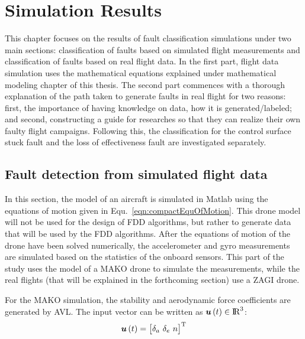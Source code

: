 \chapter{Simulation Results}

This chapter focuses on the results of fault classification simulations under two main sections: classification of faults based on simulated flight measurements and classification of faults based on real flight data. 
In the first part, flight data simulation uses the mathematical equations explained under mathematical modeling chapter of this thesis. 
The second part commences with a thorough explanation of the path taken to generate faults in real flight for two reasons: first, the importance of having knowledge on data, how it is generated/labeled; and second, constructing a guide for researches so that they can realize their own faulty flight campaigns. 
Following this, the classification for the control surface stuck fault and the loss of effectiveness fault are investigated separately. 

\section{Fault detection from simulated flight data}

In this section, the model of an aircraft is simulated in Matlab using the equations of motion given in Equ.~\ref{eqn:compactEquOfMotion}. 
This drone model will not be used for the design of FDD algorithms, but rather to generate data that will be used by the FDD algorithms. 
After the equations of motion of the drone have been solved numerically, the accelerometer and gyro measurements are simulated based on the statistics of the onboard sensors. 
This part of the study uses the model of a MAKO drone to simulate the measurements, while the real flights (that will be explained in the forthcoming section) use a ZAGI drone.

For the MAKO simulation, the stability and aerodynamic force coefficients are generated by AVL. The input vector can be written as $\bm{u}\left(t\right) \in {\rm I\!R} ^3 $:
\begin{equation}
\bm{u}\left(t\right)= \begin{bmatrix} {\delta}_{a}\ {\delta}_{e}\ n \end{bmatrix}^{\rm T}
\end{equation}

